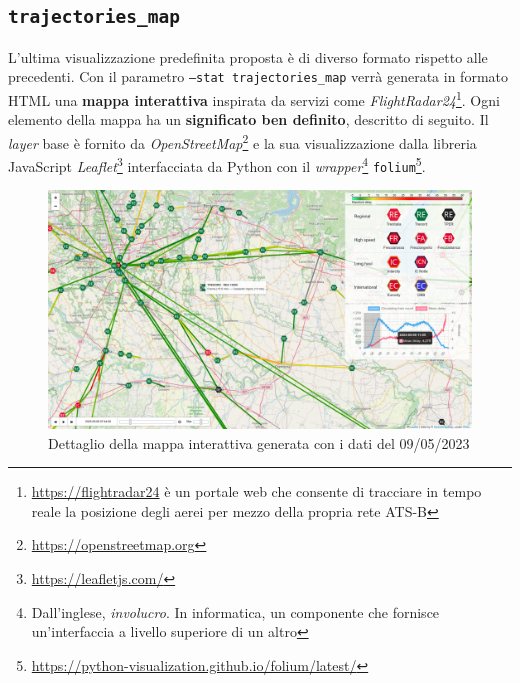 \documentclass[12pt,italian]{report}
\begin{document}
\subsection{\texttt{trajectories\_map}}

L'ultima visualizzazione predefinita proposta è di diverso formato
rispetto alle precedenti.  Con il parametro \texttt{--stat
    trajectories\_\-map} verrà generata in formato HTML una
\textbf{mappa interattiva} inspirata da servizi come
\textit{FlightRadar24}\footnote{\href{https://flightradar24.com}{https://flightradar24}
    è un portale web che consente di tracciare in tempo reale la
    posizione degli aerei per mezzo della propria rete ATS-B}.  Ogni
elemento della mappa ha un \textbf{significato ben definito},
descritto di seguito.  Il \textit{layer} base è fornito da
\textit{OpenStreetMap}\footnote{\href{https://openstreetmap.org}{https://openstreetmap.org}}
e la sua visualizzazione dalla libreria JavaScript
\textit{Leaflet}\footnote{\href{https://leafletjs.com/}{https://leafletjs.com/}}
interfacciata da Python con il \textit{wrapper}\footnote{Dall'inglese,
    \textit{involucro}.  In informatica, un componente che fornisce
    un'interfaccia a livello superiore di un altro}
\texttt{folium}\footnote{\href{https://python-visualization.github.io/folium/latest/}{https://python-visualization.github.io/folium/latest/}}.

\begin{figure} \centering
    \includegraphics[width=1\textwidth]{images/trajectories_map.png}
    \caption{Dettaglio della mappa interattiva generata con i dati del
        09/05/2023}
\end{figure}
\end{document}
